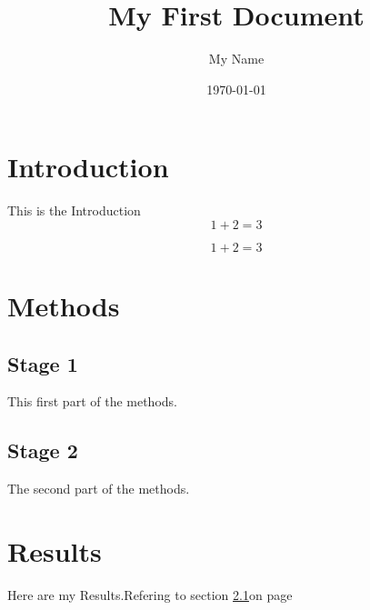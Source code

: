 \documentclass[a4paper,12pt]{article}
\begin{document}
\title{My First Document}
\author{My Name}
\date{\today}
\maketitle

\tableofcontents
\newpage
{}

\section{Introduction}
This is the Introduction
$$1+2=3$$

\begin{equation}
    1+2=3
\end{equation}

\section{Methods}

\subsection{Stage 1}
\label{sec1}

This first part of the methods.

\subsection{Stage 2}
The second part of the methods.
\cite{Birdetal2001}

\section{Results}
Here are my Results.Refering to section \ref{sec1}on page \pageref{sec1}



\end{document}
